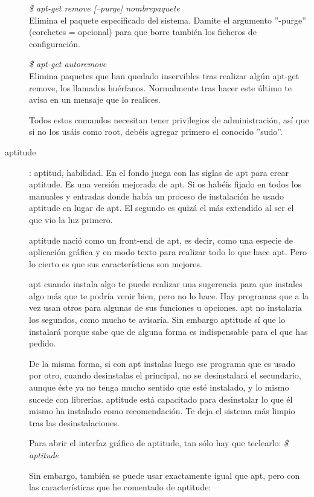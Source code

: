 \documentclass[12pt,spanish,lettersize,twocolumn]{article}
\begin{document}
\begin{description}
\emph{\$ apt-get remove [--purge] nombrepaquete}\\

Elimina el paquete especificado del sistema. Damite el argumento ''-purge'' (corchetes = opcional) para que borre tambi\'en los ficheros de configuraci\'on.

\emph{\$ apt-get autoremove}\\

Elimina paquetes que han quedado inservibles tras realizar algún apt-get remove, los llamados hu\'erfanos. Normalmente tras hacer este último te avisa en un mensaje que lo realices.

Todos estos comandos necesitan tener privilegios de administraci\'on, as\'i que si no los us\'ais como root, deb\'eis agregar primero el conocido ''sudo''.

\item[aptitude]: aptitud, habilidad. En el fondo juega con las siglas de apt para crear aptitude. Es una versi\'on mejorada de apt. Si os hab\'eis fijado en todos los manuales y entradas donde hab\'ia un proceso de instalaci\'on he usado aptitude en lugar de apt. El segundo es quiz\'a el m\'as extendido al ser el que vio la luz primero.

aptitude naci\'o como un front-end de apt, es decir, como una especie de aplicaci\'on gr\'afica y en modo texto para realizar todo lo que hace apt. Pero lo cierto es que sus caracter\'isticas son mejores.

apt cuando instala algo te puede realizar una sugerencia para que instales algo m\'as que te podr\'ia venir bien, pero no lo hace. Hay programas que a la vez usan otros para algunas de sus funciones u opciones. apt no instalar\'ia los segundos, como mucho te avisar\'ia. Sin embargo aptitude s\'i que lo instalar\'a porque sabe que de alguna forma es indispensable para el que has pedido.

De la misma forma, si con apt instalas luego ese programa que es usado por otro, cuando desinstalas el principal, no se desinstalar\'a el secundario, aunque \'este ya no tenga mucho sentido que est\'e instalado, y lo mismo sucede con librer\'ias. aptitude est\'a capacitado para desinstalar lo que \'el mismo ha instalado como recomendaci\'on. Te deja el sistema m\'as limpio tras las desinstalaciones.

Para abrir el interfaz gr\'afico de aptitude, tan s\'olo hay que teclearlo: \emph{\$ aptitude}

Sin embargo, tambi\'en se puede usar exactamente igual que apt, pero con las caracter\'isticas que he comentado de aptitude:


\end{description}
\end{document}
